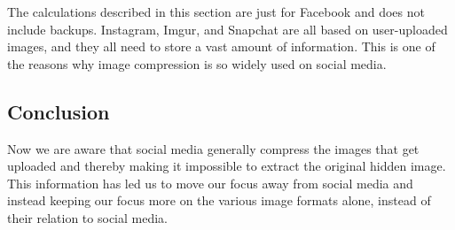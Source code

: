 The calculations described in this section are just for Facebook and does not include backups.
Instagram, Imgur, and Snapchat are all based on user-uploaded images, and they all need to store a vast amount of information.
This is one of the reasons why image compression is so widely used on social media.

\subsection*{Conclusion}
Now we are aware that social media generally compress the images that get uploaded and thereby making it impossible to extract the original hidden image.
This information has led us to move our focus away from social media and instead keeping our focus more on the various image formats alone, instead of their relation to social media.

